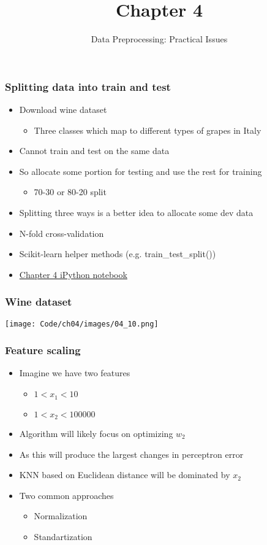 \documentclass{beamer}
\title{Chapter 4}
\subtitle{Data Preprocessing: Practical Issues}
\begin{document}
\maketitle

\begin{frame}
  \frametitle{Splitting data into train and test}
  \begin{itemize}
  \item Download wine dataset
    \begin{itemize}
    \item Three classes which map to different types of grapes in Italy
    \end{itemize}
  \item Cannot train and test on the same data
  \item So allocate some portion for testing and use the rest for training
    \begin{itemize}
    \item 70-30 or 80-20 split
    \end{itemize}
  \item Splitting three ways is a better idea to allocate some dev data
  \item N-fold cross-validation
  \item Scikit-learn helper methods (e.g. train\_test\_split())
  \item \href{https://github.com/rasbt/python-machine-learning-book/blob/master/code/ch04/ch04.ipynb}{Chapter 4 iPython notebook}
  \end{itemize}
\end{frame}

\begin{frame}
  \frametitle{Wine dataset}
  \texttt{[image: Code/ch04/images/04\_10.png]} 
\end{frame}

\begin{frame}
  \frametitle{Feature scaling}
  \begin{itemize}
  \item Imagine we have two features
    \begin{itemize}
    \item $1 < x_1 < 10$
    \item $1 < x_2 < 100000$
    \end{itemize}
  \item Algorithm will likely focus on optimizing $w_2$
  \item As this will produce the largest changes in perceptron error
  \item KNN based on Euclidean distance will be dominated by $x_2$
  \item Two common approaches
    \begin{itemize}
    \item Normalization
    \item Standartization
    \end{itemize}
  \end{itemize}
\end{frame}
\end{document}
